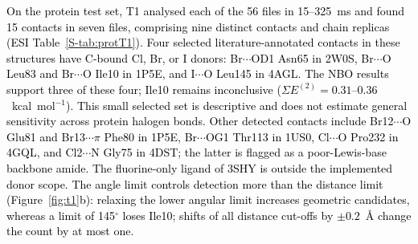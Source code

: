 \documentclass[journal=jcisd8,manuscript=article,layout=two-column]{achemso}
\newcommand{\tcb}[1]{{\textcolor{black}{#1}}}
\newcommand{\BX}{BondX Studio}
\begin{document}
\tcb{On the protein test set, T1 analysed each of the 56 files in 15--325~ms and found 15 contacts in seven files, comprising nine distinct contacts and chain replicas (ESI Table~\ref{S-tab:protT1}). Four selected literature-annotated contacts in these structures have C-bound Cl, Br, or I donors: Br$\cdots$OD1 Asn65 in 2W0S, Br$\cdots$O Leu83 and Br$\cdots$O Ile10 in 1P5E, and I$\cdots$O Leu145 in 4AGL. The NBO results support three of these four; Ile10 remains inconclusive ($\Sigma E^{(2)}=0.31$--$0.36$~kcal~mol$^{-1}$). This small selected set is descriptive and does not estimate general sensitivity across protein halogen bonds. Other detected contacts include Br12$\cdots$O Glu81 and Br13$\cdots\pi$ Phe80 in 1P5E, Br$\cdots$OG1 Thr113 in 1US0, Cl$\cdots$O Pro232 in 4GQL, and Cl2$\cdots$N Gly75 in 4DST; the latter is flagged as a poor-Lewis-base backbone amide. The fluorine-only ligand of 3SHY is outside the implemented donor scope. The angle limit controls detection more than the distance limit (Figure~\ref{fig:t1}b): relaxing the lower angular limit increases geometric candidates, whereas a limit of 145$^\circ$ loses Ile10; shifts of all distance cut-offs by $\pm0.2$~\AA{} change the count by at most one.}
\end{document}
